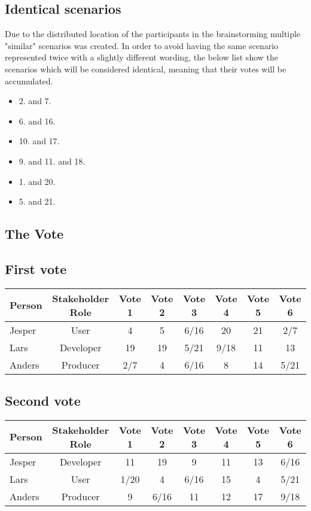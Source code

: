 \documentclass[a4paper,10pt]{article}
\begin{document}
\subsection{Identical scenarios}
Due to the distributed location of the participants in the brainstorming multiple "similar" scenarios was created. In order to avoid having the same scenario represented twice with a slightly different wording, the below list show the scenarios which will be considered identical, meaning that their votes will be accumulated.
\begin{itemize}
\item 2. and 7.
\item 6. and 16.
\item 10. and 17.
\item 9. and 11. and 18.
\item 1. and 20.
\item 5. and 21.
\end{itemize}
\subsection{The Vote}
\subsection{First vote}
\begin{tabular}{|l|c|c|c|c|c|c|c|}
\hline
Person & Stakeholder Role & Vote 1 & Vote 2 & Vote 3 & Vote 4 & Vote 5 & Vote 6\\
\hline
Jesper&User&4&5&6/16&20&21&2/7\\
Lars&Developer&19&19&5/21&9/18&11&13\\
Anders&Producer&2/7&4&6/16&8&14&5/21\\
\hline
\end{tabular}
\subsection{Second vote}
\begin{tabular}{|l|c|c|c|c|c|c|c|}
\hline
Person & Stakeholder Role & Vote 1 & Vote 2 & Vote 3 & Vote 4 & Vote 5 & Vote 6\\
\hline
Jesper&Developer&11&19&9&11&13&6/16\\
Lars&User&1/20&4&6/16&15&4&5/21\\
Anders&Producer&9&6/16&11&12&17&9/18\\
\hline
\end{tabular}
\end{document}
